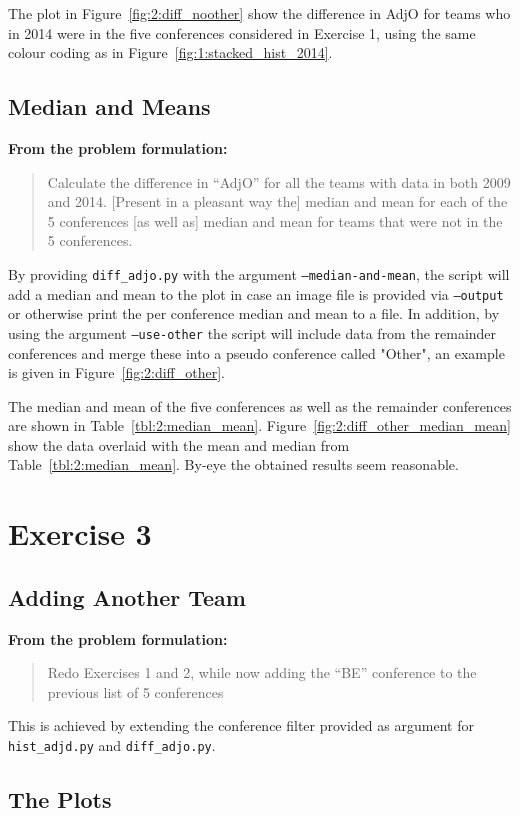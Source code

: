 \documentclass[
    12pt,
    a4paper,
    oneside, 
    headinclude,footinclude,
    BCOR5mm,
]{scrartcl}
\newcommand{\cmd}[1]{\texttt{#1}}
\newcommand{\exercisequote}[1]{%
    {\quad\bfseries \small From the problem formulation:}%
    \vspace{-.5em}%
    \begin{quote}\itshape %
        #1 %
    \end{quote}%
}
\begin{document}
The plot in Figure~\ref{fig:2:diff_noother} show the difference in AdjO
for teams who in 2014 were in the five conferences considered in Exercise 1,
using the same colour coding as in Figure~\ref{fig:1:stacked_hist_2014}.

\subsection*{Median and Means}
\exercisequote{
    Calculate the difference in ``AdjO'' for all the teams with data in both 2009 and 2014.
    [Present in a pleasant way the] median and mean for each of the 5 conferences [as well as] median and mean for teams that were not in the 5 conferences.
}
By providing \cmd{diff\_adjo.py} with the argument \cmd{--median-and-mean},
the script will add a median and mean to the plot in case an image file is provided via \cmd{--output}
or otherwise print the per conference median and mean to a file.
%
In addition, by using the argument \cmd{--use-other} the script will include data from the remainder conferences
and merge these into a pseudo conference called "Other", an example is given in Figure~\ref{fig:2:diff_other}.


The median and mean of the five conferences as well as the remainder conferences are shown in Table~\ref{tbl:2:median_mean}.
Figure~\ref{fig:2:diff_other_median_mean} show the data overlaid with the mean and median from Table~\ref{tbl:2:median_mean}.
By-eye the obtained results seem reasonable.





\section*{Exercise 3}
\subsection*{Adding Another Team}
\exercisequote{
    Redo Exercises 1 and 2, while now adding the ``BE''
    conference to the previous list of 5 conferences
}

This is achieved by extending the conference filter provided
as argument for \cmd{hist\_adjd.py} and \cmd{diff\_adjo.py}.


\subsection*{The Plots}
\end{document}
